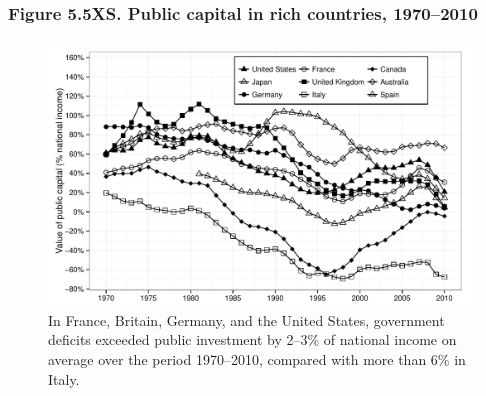 \documentclass[t]{beamer}\usepackage[]{graphicx}\usepackage[]{color}
\newenvironment{knitrout}{}{} %
\begin{document}
\begin{frame}[label=Figure_5_5XS]
\frametitle{Figure 5.5XS. Public capital in rich countries, 1970--2010}
\begin{figure}[t]
\begin{minipage}[b]{\textwidth}
\centering
\begin{knitrout}\footnotesize
{}\color{fgcolor}

{\centering \includegraphics[width=1\linewidth]{figures/bw/Figure_5_5XS} 

}



\end{knitrout}
\caption{In France, Britain, Germany, and the United States, government deficits exceeded public investment by 2--3\% of national income on average over the period 1970--2010, compared with more than 6\% in Italy.}
\end{minipage}
\end{figure}
\end{frame}
\end{document}
